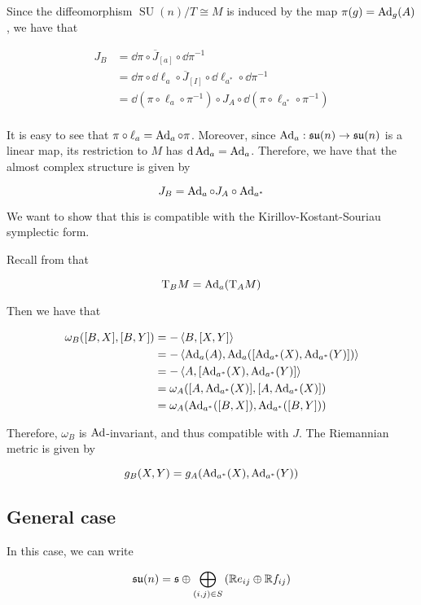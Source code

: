 \documentclass{article}
\DeclareMathOperator{\SU}{SU}
\newcommand{\su}{\mathfrak{su}}
\begin{document}
Since the diffeomorphism \(\SU(n)/T \cong M\) is induced by the map \(\pi(g) = \operatorname{Ad}_g(A)\), we have that

\begin{align*}
    J_B &= \dd\pi \circ \overline J_{[a]} \circ \dd\pi^{-1} \\
    &= \dd\pi \circ \dd \ell_a \circ \overline J_{[I]} \circ \dd \ell_{a^*} \circ \dd \pi^{-1} \\
    &= \dd(\pi \circ \ell_a \circ \pi^{-1}) \circ J_A \circ \dd(\pi \circ \ell_{a^*} \circ \pi^{-1}) \\
\end{align*}

It is easy to see that \(\pi \circ \ell_a = \operatorname{Ad}_a \circ \pi\). Moreover, since \(\Ad_a : \su(n) \to \su(n)\) is a linear map, its restriction to \(M\) has \(\dd \operatorname{Ad}_a = \operatorname{Ad}_a\). Therefore, we have that the almost complex structure is given by

\[J_B = \operatorname{Ad}_a \circ J_A \circ \operatorname{Ad}_{a^*}\]

We want to show that this is compatible with the Kirillov-Kostant-Souriau symplectic form.

Recall from that

\[\mathrm{T}_BM = \operatorname{Ad}_a(\mathrm{T}_A M)\]

Then we have that

\begin{align*}
    \omega_B([B, X], [B, Y]) &= -\left\langle B, [X, Y] \right\rangle \\
    &= -\left\langle \operatorname{Ad}_a(A), \operatorname{Ad}_a([\operatorname{Ad}_{a^*}(X), \operatorname{Ad}_{a^*}(Y)]) \right\rangle \\
    &= -\left\langle A, [\operatorname{Ad}_{a^*}(X), \operatorname{Ad}_{a^*}(Y)] \right\rangle \\
    &= \omega_A([A, \operatorname{Ad}_{a^*}(X)], [A, \operatorname{Ad}_{a^*}(X)]) \\
    &= \omega_A(\operatorname{Ad}_{a^*}([B, X]), \operatorname{Ad}_{a^*}([B, Y]))
\end{align*}

Therefore, \(\omega_B\) is \(\operatorname{Ad}\)-invariant, and thus compatible with \(J\). The Riemannian metric is given by

\[g_B(X, Y) = g_A(\operatorname{Ad}_{a^*}(X), \operatorname{Ad}_{a^*}(Y))\]

\subsection{General case}

In this case, we can write

\[\su(n) = \mfs \oplus \bigoplus_{(i, j) \in S}\left(\R e_{ij} \oplus \R f_{ij}\right)\]
\end{document}
